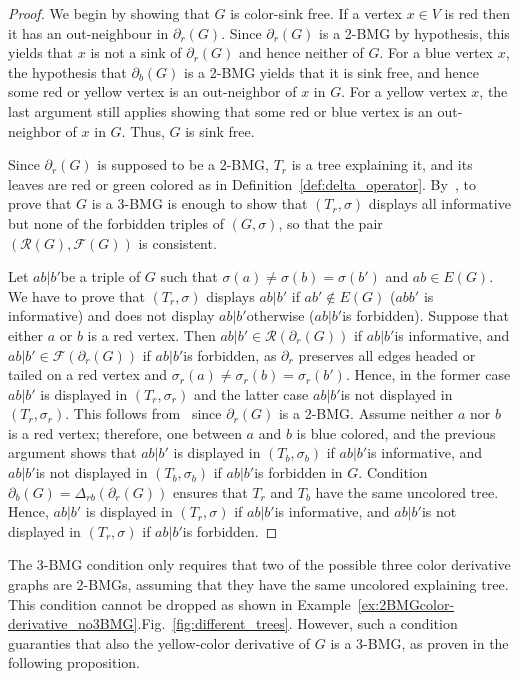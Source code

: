 \documentclass[final,3p,times]{elsarticle}
\newcommand{\OLD}[1]{\begingroup\tiny\color{gray}#1\endgroup}
\newcommand{\mh}[1]{\begingroup\color{blue}#1\endgroup}
\begin{document}
\begin{proof}
We begin by showing that $G$ is color-sink free. If a vertex $x\in V$ is red then it has an out-neighbour in $\partial_{r}(G)$. Since $\partial_{r}(G)$ is a 2-BMG by hypothesis, this yields that $x$ is not a sink of $\partial_{r}(G)$ and hence neither of $G$. For a blue vertex $x$, the hypothesis that $\partial_b(G)$ is a 2-BMG yields that it is sink free, and hence some red or yellow vertex is an out-neighbor of $x$ in $G$. For a yellow vertex $x$, the last argument still applies showing that some red or blue vertex is an out-neighbor of $x$ in $G$. Thus, $G$ is sink free.

Since $\partial_{r}(G)$ is supposed to be a 2-BMG, $T_r$ is a tree explaining it, and its leaves are red or green colored as in Definition~\ref{def:delta_operator}. By~\cite[Proposition~2.3]{korchmaros2021quasi}, to prove that $G$ is a 3-BMG is enough to show that $(T_r,\sigma)$ displays all informative but none of the forbidden triples of $(G,\sigma)$, so that the pair $(\mathscr{R}(G),\mathscr{F}(G))$ is consistent.

Let $ab|b'$be a triple of $G$ such that $\sigma(a)\ne \sigma(b)=\sigma(b')$ and $ab\in E(G)$. We have to prove that $(T_r,\sigma)$ displays $ab|b'$ if $ab'\notin E(G)$ ($ abb'$ is informative) and does not display $ab|b'$otherwise ($ab|b'$is forbidden). Suppose that either $a$ or $b$ is a red vertex. Then $ab|b'\in \mathscr{R}(\partial_{r}(G))$ if $ab|b'$is informative, and $ab|b'\in \mathscr{F}(\partial_{r}(G))$ if $ab|b'$is forbidden, as $\partial_{r}$ preserves all edges headed or tailed on a red vertex and $\sigma_r(a)\ne \sigma_r(b)=\sigma_r(b')$. Hence, in the former case $ab|b'$ is displayed in $(T_r,\sigma_r)$ and the latter case $ab|b'$is not displayed in $(T_r,\sigma_r)$. This follows from~\cite[Proposition~2.3]{korchmaros2021quasi} since $\partial_{r}(G)$ is a 2-BMG. Assume neither $a$ nor $b$ is a red vertex; therefore, one between $a$ and $b$ is blue colored, and the previous argument shows that $ab|b'$ is displayed in $(T_b,\sigma_b)$ if $ab|b'$is informative, and $ab|b'$is not displayed in $(T_b,\sigma_b)$ if $ab|b'$is forbidden in $G$. Condition $\partial_b(G)=\Delta_{rb}(\partial_r(G))$ ensures that $T_r$ and $T_b$ have the same uncolored tree. Hence, $ab|b'$ is displayed in $(T_r,\sigma)$ if $ab|b'$is informative, and $ab|b'$is not displayed in $(T_r,\sigma)$ if $ab|b'$is forbidden.
\end{proof}

The 3-BMG condition only requires that two of the possible three color derivative graphs are 2-BMGs, assuming that they have the same uncolored explaining tree. This condition cannot be dropped as shown in \OLD{Example~\ref{ex:2BMGcolor-derivative_no3BMG}.}\mh{Fig.\ \ref{fig:different_trees}.}
 However, such a condition guaranties that also the yellow-color derivative of $G$ is a 3-BMG, as proven in the following proposition. 
\end{document}
